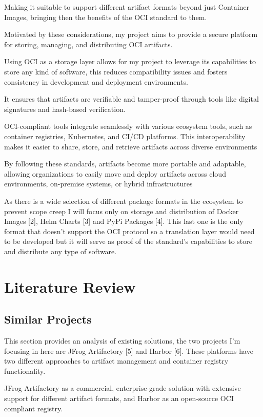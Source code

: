 \documentclass{article}
\begin{document}
  Making it suitable to support different artifact formats beyond just Container Images, bringing then the benefits of the OCI standard to them.

  Motivated by these considerations, my project aims to provide a secure platform for storing, managing, and distributing OCI artifacts.

  Using OCI as a storage layer allows for my project to leverage its capabilities to store any kind of software, this reduces compatibility issues and fosters consistency in development and deployment environments. 

  It ensures that artifacts are verifiable and tamper-proof through tools like digital signatures and hash-based verification.

  OCI-compliant tools integrate seamlessly with various ecosystem tools, such as container registries, Kubernetes, and CI/CD platforms. This interoperability makes it easier to share, store, and retrieve artifacts across diverse environments

  By following these standards, artifacts become more portable and adaptable, allowing organizations to easily move and deploy artifacts across cloud environments, on-premise systems, or hybrid infrastructures

  As there is a wide selection of different package formats in the ecosystem to prevent scope creep I will focus only on storage and distribution of Docker Images [2], Helm Charts [3] and PyPi Packages [4]. This last one is the only format that doesn't support the OCI protocol so a translation layer would need to be developed but it will serve as proof of the standard's capabilities to store and distribute any type of software.

  \section{Literature Review}

  \subsection{Similar Projects}

  This section provides an analysis of existing solutions, the two projects I'm focusing in here are JFrog Artifactory [5] and Harbor [6]. These platforms have two different approaches to artifact management and container registry functionality.
  
  JFrog Artifactory as a commercial, enterprise-grade solution with extensive support for different artifact formats, and Harbor as an open-source OCI compliant registry.
\end{document}
